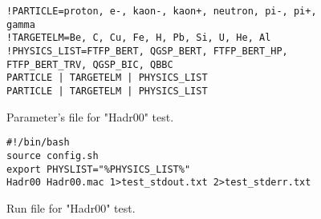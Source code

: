 \begin{figure}
\begin{lstlisting}
!PARTICLE=proton, e-, kaon-, kaon+, neutron, pi-, pi+, gamma
!TARGETELM=Be, C, Cu, Fe, H, Pb, Si, U, He, Al
!PHYSICS_LIST=FTFP_BERT, QGSP_BERT, FTFP_BERT_HP, FTFP_BERT_TRV, QGSP_BIC, QBBC
PARTICLE | TARGETELM | PHYSICS_LIST
PARTICLE | TARGETELM | PHYSICS_LIST
\end{lstlisting}
\caption{Parameter's file for "Hadr00" test.}
\label{hadr00-parameters}
\end{figure}


\begin{figure}

\begin{verbatim}
#!/bin/bash
source config.sh
export PHYSLIST="%PHYSICS_LIST%"
Hadr00 Hadr00.mac 1>test_stdout.txt 2>test_stderr.txt
\end{verbatim}
\caption{Run file for "Hadr00" test.}
\label{hadr00-run}
\end{figure}